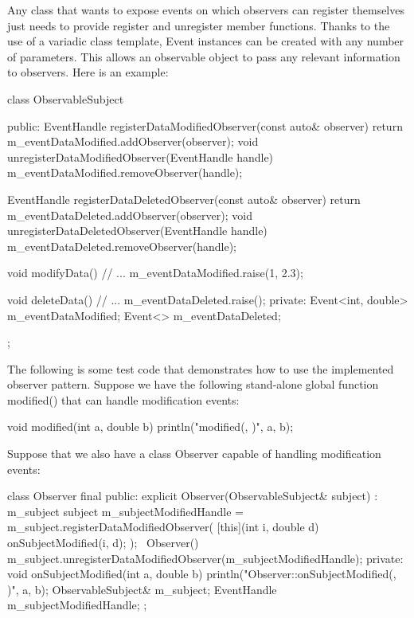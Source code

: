 Any class that wants to expose events on which observers can register themselves just needs to provide register and unregister member functions. Thanks to the use of a variadic class template, Event instances can be created with any number of parameters. This allows an observable object to pass any relevant information to observers. Here is an example:

\begin{cpp}
class ObservableSubject
{
    public:
        EventHandle registerDataModifiedObserver(const auto& observer) {
        return m_eventDataModified.addObserver(observer); }
        void unregisterDataModifiedObserver(EventHandle handle) {
            m_eventDataModified.removeObserver(handle); }

        EventHandle registerDataDeletedObserver(const auto& observer) {
            return m_eventDataDeleted.addObserver(observer); }
        void unregisterDataDeletedObserver(EventHandle handle) {
            m_eventDataDeleted.removeObserver(handle); }

        void modifyData()
        {
            // ...
            m_eventDataModified.raise(1, 2.3);
        }

        void deleteData()
        {
            // ...
            m_eventDataDeleted.raise();
        }
    private:
        Event<int, double> m_eventDataModified;
        Event<> m_eventDataDeleted;
};
\end{cpp}


The following is some test code that demonstrates how to use the implemented observer pattern. Suppose we have the following stand-alone global function modified() that can handle modification events:

\begin{cpp}
void modified(int a, double b) { println("modified({}, {})", a, b); }
\end{cpp}

Suppose that we also have a class Observer capable of handling modification events:

\begin{cpp}
class Observer final
{
    public:
        explicit Observer(ObservableSubject& subject) : m_subject { subject }
        {
            m_subjectModifiedHandle = m_subject.registerDataModifiedObserver(
                [this](int i, double d) { onSubjectModified(i, d); });
        }
        ~Observer()
        {
            m_subject.unregisterDataModifiedObserver(m_subjectModifiedHandle);
        }
    private:
        void onSubjectModified(int a, double b)
        {
            println("Observer::onSubjectModified({}, {})", a, b);
        }
        ObservableSubject& m_subject;
        EventHandle m_subjectModifiedHandle;
};
\end{cpp}

